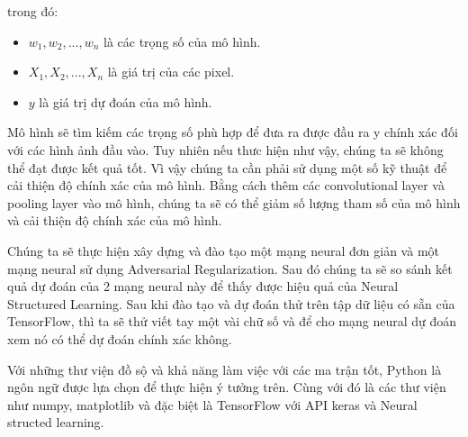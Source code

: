 trong đó:
\begin{itemize}
    \item $w_1, w_2, ..., w_n$ là các trọng số của mô hình.
    \item $X_1, X_2, ..., X_n$ là giá trị của các pixel.
    \item $y$ là giá trị dự đoán của mô hình.
\end{itemize}


Mô hình sẽ tìm kiếm các trọng số phù hợp để đưa ra được đầu ra y chính xác đối với các hình ảnh đầu vào.
Tuy nhiên nếu thưc hiện như vậy, chúng ta sẽ không thể đạt được kết quả tốt. Vì vậy chúng ta cần phải sử dụng một số kỹ thuật để cải thiện độ chính xác của mô hình.
Bằng cách thêm các convolutional layer và pooling layer vào mô hình, chúng ta sẽ có thể giảm số lượng tham số của mô hình và cải thiện độ chính xác của mô hình.



Chúng ta sẽ thực hiện xây dựng và đào tạo một mạng neural đơn giản và một mạng neural sử dụng Adversarial Regularization. Sau đó chúng ta sẽ so sánh kết quả 
dự đoán của 2 mạng neural này để thấy được hiệu quả của Neural Structured Learning. Sau khi đào tạo và dự đoán thử trên tập dữ liệu có sẵn của TensorFlow, thì
ta sẽ thử viết tay một vài chữ số và để cho mạng neural dự đoán xem nó có thể dự đoán chính xác không.

Với những thư viện đồ sộ và khả năng làm việc với các ma trận tốt, Python là ngôn ngữ được lựa chọn để thực hiện ý tưởng trên. Cùng với đó là các thư viện như numpy, matplotlib và
đặc biệt là TensorFlow với API keras và Neural structed learning.



